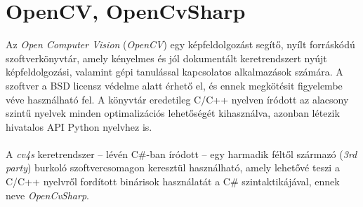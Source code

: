 \section{OpenCV, OpenCvSharp}

Az \emph{Open Computer Vision} (\emph{OpenCV}) egy képfeldolgozást segítő, nyílt forráskódú szoftverkönyvtár, amely kényelmes és jól dokumentált keretrendszert nyújt képfeldolgozási, valamint gépi tanulással kapcsolatos alkalmazások számára. A szoftver a BSD licensz védelme alatt érhető el, és ennek megkötésit figyelembe véve használható fel. A könyvtár eredetileg C/C++ nyelven íródott az alacsony szintű nyelvek minden optimalizációs lehetőségét kihasználva, azonban létezik hivatalos API Python nyelvhez is. \\
\\
A \emph{cv4s} keretrendszer -- lévén C\#-ban íródott -- egy harmadik féltől származó (\textit{3rd party}) burkoló szoftvercsomagon keresztül használható, amely lehetővé teszi a C/C++ nyelvről fordított binárisok használatát a C\# szintaktikájával, ennek neve \emph{OpenCvSharp}.
